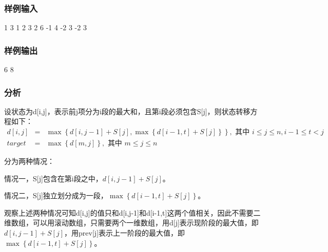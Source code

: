 \subsubsection{样例输入}
\begin{Code}
1 3 1 2 3
2 6 -1 4 -2 3 -2 3
\end{Code}

\subsubsection{样例输出}
\begin{Code}
6
8
\end{Code}

\subsubsection{分析}
设状态为d[i,j]，表示前j项分为i段的最大和，且第i段必须包含S[j]，则状态转移方程如下：
\begin{eqnarray}
d[i,j] &=& \max\left\{d[i,j-1]+S[j],\max\left\{d[i-1,t]+S[j]\right\}\right\}, \text{ 其中 }i \leq j \leq n, i-1 \leq t < j \nonumber \\
target &=& \max\left\{d[m,j]\right\}, \text{ 其中 }m \leq j \leq n \nonumber
\end{eqnarray}

分为两种情况：
\begindot
\item 情况一，S[j]包含在第i段之中，$d[i,j-1]+S[j]$。
\item 情况二，S[j]独立划分成为一段，$\max\left\{d[i-1,t]+S[j]\right\}$。
\myenddot

观察上述两种情况可知d[i,j]的值只和d[i,j-1]和d[i-1,t]这两个值相关，因此不需要二维数组，可以用滚动数组，只需要两个一维数组，用d[j]表示现阶段的最大值，即$d[i,j-1]+S[j]$，用prev[j]表示上一阶段的最大值，即$\max\left\{d[i-1,t]+S[j]\right\}$。

